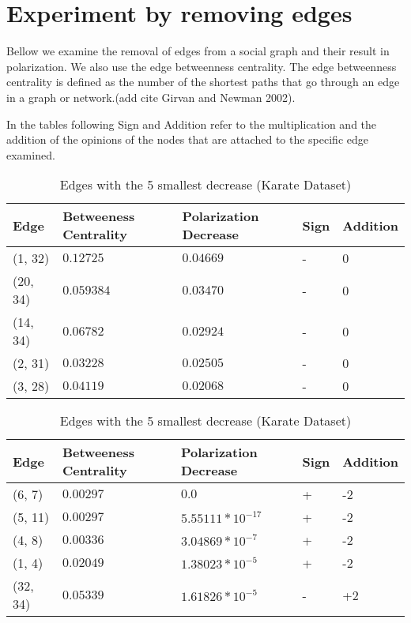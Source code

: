 \section{Experiment by removing edges}
\label{sec:properties}
Bellow we examine the removal of edges from a social graph and their result in polarization. We also use the edge betweenness centrality. The edge betweenness centrality is defined as the number of the shortest paths that go through an edge in a graph or network.(add cite Girvan and Newman 2002). 

In the tables following Sign and Addition refer to the multiplication and the addition of the opinions of the nodes that are attached to the specific edge examined. 
\\

\begin{table}[!htb]
 \centering
 \caption{Edges with the 5 largest decrease (Karate Dataset)}
 \label{tab:edgesLargest}
 \begin{tabular}{| l || l | l | l | l |}
 \hline
  Edge & Betweeness Centrality & Polarization Decrease & Sign & Addition\\
  \hline
  \hline
  (1, 32) & $0.12725$ & $0.04669$ & - &  0\\
  \hline
  (20, 34) & $0.059384$ & $0.03470$ & - &  0\\
  \hline
  (14, 34) & $0.06782$ & $0.02924$ & - &  0\\
  \hline
  (2, 31) & $0.03228$ & $0.02505$ & - &  0\\
  \hline
  (3, 28) & $0.04119$ & $0.02068$ & - &  0\\
  \hline
 \end{tabular}
 
 \vspace{\floatsep}
 
 \caption{Edges with the 5 smallest decrease (Karate Dataset)}
 \label{tab:edgesLargest}
 \begin{tabular}{| l || l | l | l | l |}
 \hline
  Edge & Betweeness Centrality & Polarization Decrease & Sign & Addition\\
  \hline
  \hline
  (6, 7) & $0.00297$ & $0.0$ & + &  -2\\
  \hline
  (5, 11) & $0.00297$ & $5.55111*10^{-17}$ & + &  -2\\
  \hline
  (4, 8) & $0.00336$ & $3.04869*10^{-7}$ & + &  -2\\
  \hline
  (1, 4) & $0.02049$ & $1.38023*10^{-5}$ & + &  -2\\
  \hline
  (32, 34) & $0.05339$ & $1.61826*10^{-5}$ & - &  +2\\
  \hline
  \hline
 \end{tabular}
 
\end{table}

